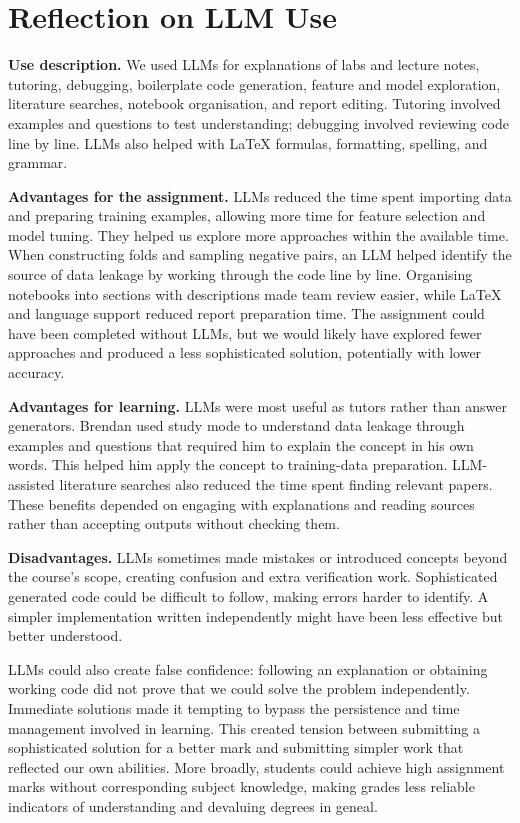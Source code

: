 \documentclass[runningheads]{llncs}
\begin{document}
\section{Reflection on LLM Use}

\noindent\textbf{Use description.} We used LLMs for explanations of labs and lecture notes, tutoring, debugging, boilerplate code generation, feature and model exploration, literature searches, notebook organisation, and report editing. Tutoring involved examples and questions to test understanding; debugging involved reviewing code line by line. LLMs also helped with LaTeX formulas, formatting, spelling, and grammar.

\medskip
\noindent\textbf{Advantages for the assignment.} LLMs reduced the time spent importing data and preparing training examples, allowing more time for feature selection and model tuning. They helped us explore more approaches within the available time. When constructing folds and sampling negative pairs, an LLM helped identify the source of data leakage by working through the code line by line. Organising notebooks into sections with descriptions made team review easier, while LaTeX and language support reduced report preparation time. The assignment could have been completed without LLMs, but we would likely have explored fewer approaches and produced a less sophisticated solution, potentially with lower accuracy.

\medskip
\noindent\textbf{Advantages for learning.} LLMs were most useful as tutors rather than answer generators. Brendan used study mode to understand data leakage through examples and questions that required him to explain the concept in his own words. This helped him apply the concept to training-data preparation. LLM-assisted literature searches also reduced the time spent finding relevant papers. These benefits depended on engaging with explanations and reading sources rather than accepting outputs without checking them.

\medskip
\noindent\textbf{Disadvantages.} LLMs sometimes made mistakes or introduced concepts beyond the course's scope, creating confusion and extra verification work. Sophisticated generated code could be difficult to follow, making errors harder to identify. A simpler implementation written independently might have been less effective but better understood.

LLMs could also create false confidence: following an explanation or obtaining working code did not prove that we could solve the problem independently. Immediate solutions made it tempting to bypass the persistence and time management involved in learning. This created tension between submitting a sophisticated solution for a better mark and submitting simpler work that reflected our own abilities. More broadly, students could achieve high assignment marks without corresponding subject knowledge, making grades less reliable indicators of understanding and devaluing degrees in geneal. 



\end{document}

